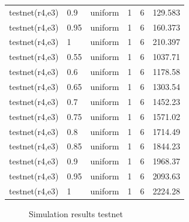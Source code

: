 \begin{longtable}[H]{llllll}
testnet(r4,e3) & 0.9  & uniform & 1 & 6       & 129.583 \\
testnet(r4,e3) & 0.95 & uniform & 1 & 6       & 160.373 \\
testnet(r4,e3) & 1    & uniform & 1 & 6       & 210.397 \\ \hline
testnet(r4,e3) & 0.55 & uniform & 1 & 6       & 1037.71 \\
testnet(r4,e3) & 0.6  & uniform & 1 & 6       & 1178.58 \\
testnet(r4,e3) & 0.65 & uniform & 1 & 6       & 1303.54 \\
testnet(r4,e3) & 0.7  & uniform & 1 & 6       & 1452.23 \\
testnet(r4,e3) & 0.75 & uniform & 1 & 6       & 1571.02 \\
testnet(r4,e3) & 0.8  & uniform & 1 & 6       & 1714.49 \\
testnet(r4,e3) & 0.85 & uniform & 1 & 6       & 1844.23 \\
testnet(r4,e3) & 0.9  & uniform & 1 & 6       & 1968.37 \\
testnet(r4,e3) & 0.95 & uniform & 1 & 6       & 2093.63 \\
testnet(r4,e3) & 1    & uniform & 1 & 6       & 2224.28 
\end{longtable}

\begin{figure}[H]
    \centering
    \caption{Simulation results testnet}
    \label{fig:testnet_1}
\end{figure}

